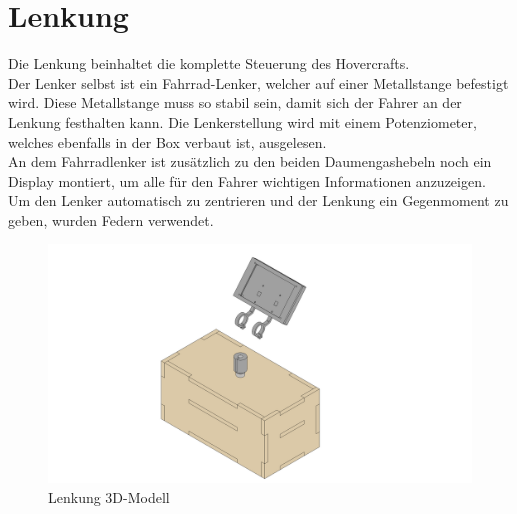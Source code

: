 \section{Lenkung}
Die Lenkung beinhaltet die komplette Steuerung des Hovercrafts.\\
Der Lenker selbst ist ein Fahrrad-Lenker, welcher auf einer Metallstange befestigt wird. Diese Metallstange muss so stabil sein, damit sich der Fahrer an der Lenkung festhalten kann. Die Lenkerstellung wird mit einem Potenziometer, welches ebenfalls in der Box verbaut ist, ausgelesen.\\
An dem Fahrradlenker ist zusätzlich zu den beiden Daumengashebeln noch ein Display montiert, um alle für den Fahrer wichtigen Informationen anzuzeigen.\\
Um den Lenker automatisch zu zentrieren und der Lenkung ein Gegenmoment zu geben, wurden Federn verwendet.
\begin{figure}[H]
    \centering
    \includegraphics[width=1.25\textwidth]{../Inventor/Lenker/png/Lenkung_Hauptansicht.png}
    \caption{Lenkung 3D-Modell}
\end{figure}

\clearpage
